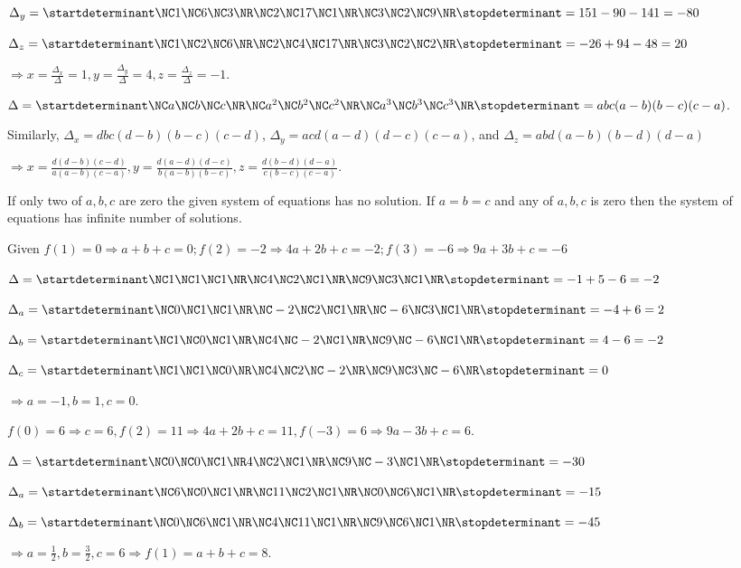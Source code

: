   $\Delta_y = \startdeterminant\NC 1\NC 6\NC 3\NR\NC 2\NC 17\NC 1\NR\NC 3\NC 2\NC 9\NR\stopdeterminant = 151
  - 90 - 141 = -80$

  $\Delta_z = \startdeterminant\NC1\NC2\NC6\NR\NC 2\NC 4\NC 17\NR\NC 3\NC 2\NC 2\NR\stopdeterminant = -26 +
  94 - 48 = 20$

  $\Rightarrow x = \frac{\Delta_x}{\Delta} = 1, y = \frac{\Delta_y}{\Delta} = 4, z = \frac{\Delta_z}{\Delta}
  = -1$.
\item $\Delta = \startdeterminant\NC a\NC b\NC c\NR\NC a^2\NC b^2\NC c^2\NR\NC a^3\NC b^3\NC
  c^3\NR\stopdeterminant = abc(a - b)(b - c)(c - a)$.

  Similarly, $\Delta_x = dbc(d - b)(b - c)(c - d)$, $\Delta_y = acd(a - d)(d - c)(c - a)$, and $\Delta_z =
  abd(a - b)(b - d)(d - a)$

  $\Rightarrow x = \frac{d(d - b)(c - d)}{a(a - b)(c - a)}, y = \frac{d(a - d)(d - c)}{b(a - b)(b - c)}, z =
  \frac{d(b - d)(d - a)}{c(b - c)(c - a)}$.

  If only two of $a, b, c$ are zero the given system of equations has no solution. If $a = b = c$ and any of
  $a, b, c$ is zero then the system of equations has infinite number of solutions.
\item Given $f(1) = 0 \Rightarrow a + b + c = 0; f(2) = -2 \Rightarrow 4a + 2b + c = -2; f(3) = -6
  \Rightarrow 9a + 3b + c = -6$

  $\Delta = \startdeterminant\NC 1\NC 1\NC 1\NR\NC 4\NC 2\NC 1\NR\NC 9\NC 3\NC 1\NR\stopdeterminant = -1 + 5
  - 6 = -2$

  $\Delta_a = \startdeterminant\NC 0\NC 1\NC 1\NR\NC -2\NC 2\NC 1\NR\NC -6\NC 3\NC 1\NR\stopdeterminant = -4
  + 6 = 2$

  $\Delta_b = \startdeterminant\NC 1\NC 0\NC 1\NR\NC 4\NC -2\NC 1\NR\NC 9\NC -6\NC 1\NR\stopdeterminant = 4
  - 6 = -2$

  $\Delta_c = \startdeterminant\NC 1\NC 1\NC 0\NR\NC 4\NC 2\NC -2\NR\NC 9\NC 3\NC -6\NR\stopdeterminant = 0$

  $\Rightarrow a = -1, b = 1, c = 0$.
\item $f(0) = 6 \Rightarrow c = 6, f(2) = 11\Rightarrow 4a + 2b + c = 11, f(-3) = 6 \Rightarrow 9a - 3b + c
  = 6$.

  $\Delta = \startdeterminant\NC 0\NC 0\NC 1\NR 4\NC 2\NC 1\NR\NC 9\NC -3\NC 1\NR\stopdeterminant = -30$

  $\Delta_a = \startdeterminant\NC 6\NC 0\NC 1\NR\NC 11\NC 2\NC 1\NR\NC 0\NC 6\NC 1\NR\stopdeterminant =
  -15$

  $\Delta_b =\startdeterminant\NC 0\NC 6\NC 1\NR\NC 4\NC 11\NC 1\NR\NC 9\NC 6\NC 1\NR\stopdeterminant = -45$

  $\Rightarrow a = \frac{1}{2}, b = \frac{3}{2}, c = 6\Rightarrow f(1) = a + b + c = 8$.
\stopitemize
